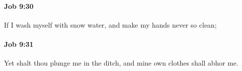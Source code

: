 		\paragraph{Job 9:30} %
			\label{JOB-9-30}

			If I wash myself with snow water, and make my hands never so clean;


		\paragraph{Job 9:31} %
			\label{JOB-9-31}

			Yet shalt thou plunge me in the ditch, and mine own clothes shall abhor me.


